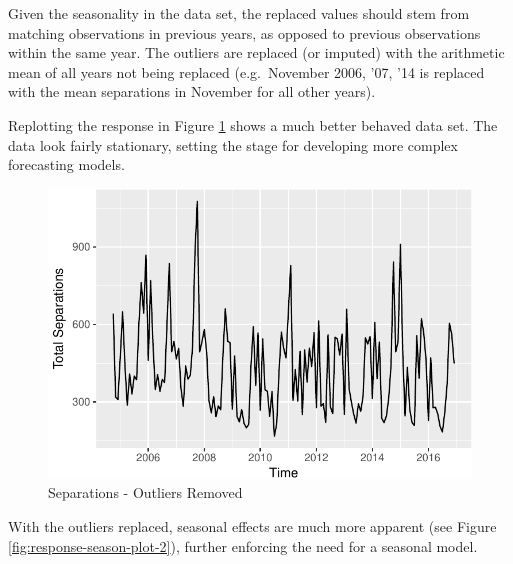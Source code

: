 \documentclass[12pt,letterpaper,toc=flat,oneside]{report}
\theoremstyle{definition}
\theoremstyle{definition}
\theoremstyle{definition}
\theoremstyle{remark}
\begin{document}
Given the seasonality in the data set, the replaced values should stem
from matching observations in previous years, as opposed to previous
observations within the same year. The outliers are replaced (or
imputed) with the arithmetic mean of all years not being replaced
(e.g.~November 2006, '07, '14 is replaced with the mean separations in
November for all other years).

Replotting the response in Figure \ref{fig:response-plot-2} shows a much
better behaved data set. The data look fairly stationary, setting the
stage for developing more complex forecasting models.

\begin{figure}[H]

{\centering \includegraphics{elliott-econometric-personnel-retention-18_files/figure-latex/response-plot-2-1} 

}

\caption{Separations - Outliers Removed}\label{fig:response-plot-2}
\end{figure}

With the outliers replaced, seasonal effects are much more apparent (see
Figure \ref{fig:response-season-plot-2}), further enforcing the need for
a seasonal model.
\end{document}
